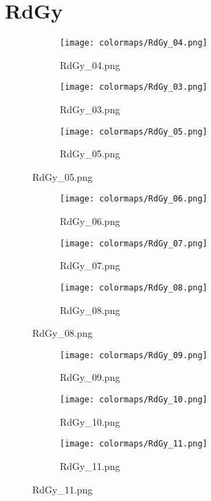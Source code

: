\documentclass{article}%
\begin{document}
%
\newpage%
\section{RdGy}%
\label{sec:RdGy}%
\hspace{1cm}\hfill%
\hspace{1cm}\hfill%
\hspace{1cm}\hfill%


\begin{figure}[h!]%
\begin{subfigure}[b]{0.3\linewidth}%
\texttt{[image: colormaps/RdGy\_04.png]}%
\caption{RdGy\_04.png}%
\end{subfigure}%
\begin{subfigure}[b]{0.3\linewidth}%
\texttt{[image: colormaps/RdGy\_03.png]}%
\caption{RdGy\_03.png}%
\end{subfigure}%
\begin{subfigure}[b]{0.3\linewidth}%
\texttt{[image: colormaps/RdGy\_05.png]}%
\caption{RdGy\_05.png}%
\end{subfigure}%
\end{figure}

%
\hspace{1cm}\hfill%
\hspace{1cm}\hfill%
\hspace{1cm}\hfill%


\begin{figure}[h!]%
\begin{subfigure}[b]{0.3\linewidth}%
\texttt{[image: colormaps/RdGy\_06.png]}%
\caption{RdGy\_06.png}%
\end{subfigure}%
\begin{subfigure}[b]{0.3\linewidth}%
\texttt{[image: colormaps/RdGy\_07.png]}%
\caption{RdGy\_07.png}%
\end{subfigure}%
\begin{subfigure}[b]{0.3\linewidth}%
\texttt{[image: colormaps/RdGy\_08.png]}%
\caption{RdGy\_08.png}%
\end{subfigure}%
\end{figure}

%
\hspace{1cm}\hfill%
\hspace{1cm}\hfill%
\hspace{1cm}\hfill%


\begin{figure}[h!]%
\begin{subfigure}[b]{0.3\linewidth}%
\texttt{[image: colormaps/RdGy\_09.png]}%
\caption{RdGy\_09.png}%
\end{subfigure}%
\begin{subfigure}[b]{0.3\linewidth}%
\texttt{[image: colormaps/RdGy\_10.png]}%
\caption{RdGy\_10.png}%
\end{subfigure}%
\begin{subfigure}[b]{0.3\linewidth}%
\texttt{[image: colormaps/RdGy\_11.png]}%
\caption{RdGy\_11.png}%
\end{subfigure}%
\end{figure}
\end{document}
